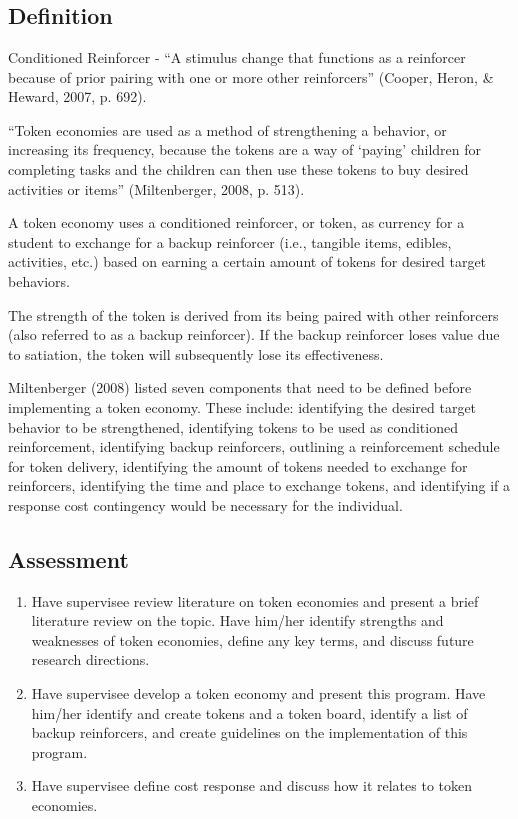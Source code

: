 \clearpage \section[\fourfTwo{}]{\fourfTwo{}%
              }
\subsection{Definition}
Conditioned Reinforcer - ``A stimulus change that functions as a reinforcer because of prior pairing with one or more other reinforcers'' (Cooper, Heron, \& Heward, 2007, p. 692).

``Token economies are used as a method of strengthening a behavior, or increasing its frequency, because the tokens are a way of ‘paying' children for completing tasks and the children can then use these tokens to buy desired activities or items'' (Miltenberger, 2008, p. 513).

A token economy uses a conditioned reinforcer, or token, as currency for a student to exchange for a backup reinforcer (i.e., tangible items, edibles, activities, etc.) based on earning a certain amount of tokens for desired target behaviors. 

The strength of the token is derived from its being paired with other reinforcers (also referred to as a backup reinforcer). If the backup reinforcer loses value due to satiation, the token will subsequently lose its effectiveness.

Miltenberger (2008) listed seven components that need to be defined before implementing a token economy. These include: identifying the desired target behavior to be strengthened, identifying tokens to be used as conditioned reinforcement, identifying backup reinforcers, outlining a reinforcement schedule for token delivery, identifying the amount of tokens needed to exchange for reinforcers, identifying the time and place to exchange tokens, and identifying if a response cost contingency would be necessary for the individual. 


\subsection{Assessment}
\begin{enumerate}
\item Have supervisee review literature on token economies and present a brief literature review on the topic. Have him/her identify strengths and weaknesses of token economies, define any key terms, and discuss future research directions.
\item Have supervisee develop a token economy and present this program. Have him/her identify and create tokens and a token board, identify a list of backup reinforcers, and create guidelines on the implementation of this program.
\item Have supervisee define cost response and discuss how it relates to token economies.
\end{enumerate}
%
